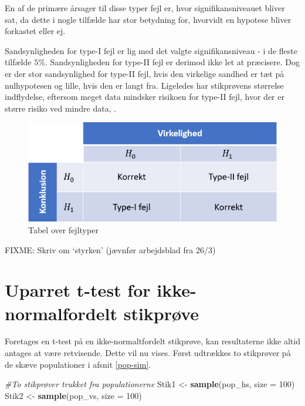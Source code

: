 \documentclass[
]{book}
\newenvironment{Shaded}{\begin{snugshade}}{\end{snugshade}}
\newcommand{\CommentTok}[1]{\textcolor[rgb]{0.56,0.35,0.01}{\textit{#1}}}
\newcommand{\DataTypeTok}[1]{\textcolor[rgb]{0.13,0.29,0.53}{#1}}
\newcommand{\DecValTok}[1]{\textcolor[rgb]{0.00,0.00,0.81}{#1}}
\newcommand{\KeywordTok}[1]{\textcolor[rgb]{0.13,0.29,0.53}{\textbf{#1}}}
\newcommand{\NormalTok}[1]{#1}
\newcommand{\StringTok}[1]{\textcolor[rgb]{0.31,0.60,0.02}{#1}}
\theoremstyle{definition}
\theoremstyle{definition}
\theoremstyle{definition}
\theoremstyle{remark}
\begin{document}
En af de primære årsager til disse typer fejl er, hvor signifikansniveauet bliver sat, da dette i nogle tilfælde har stor betydning for, hvorvidt en hypotese bliver forkastet eller ej.

Sandsynligheden for type-I fejl er lig med det valgte signifikansniveau - i de fleste tilfælde \(5\%\). Sandsynligheden for type-II fejl er derimod ikke let at præcisere. Dog er der stor sandsynlighed for type-II fejl, hvis den virkelige sandhed er tæt på nulhypotesen og lille, hvis den er langt fra. Ligeledes har stikprøvens størrelse indflydelse, eftersom meget data mindsker risikoen for type-II fejl, hvor der er større risiko ved mindre data, \citep{Fejltyper}.

\begin{figure}

{\centering \includegraphics[width=0.75\linewidth]{images/Typefejl}

}

\caption{Tabel over fejltyper}\label{fig:figur-typefejl}
\end{figure}

FIXME: Skriv om `styrken' (jævnfør arbejdsblad fra 26/3)

\hypertarget{uparret-t-test-for-ikke-normalfordelt-stikpruxf8ve}{%
\section{Uparret t-test for ikke-normalfordelt stikprøve}\label{uparret-t-test-for-ikke-normalfordelt-stikpruxf8ve}}

Foretages en t-test på en ikke-normaltfordelt stikprøve, kan resultaterne ikke altid antages at være retvisende. Dette vil nu vises. Først udtrækkes to stikprøver på de skæve populationer i afsnit \ref{pop-sim}.

\begin{Shaded}
\begin{Highlighting}[]
\CommentTok{#To stikprøver trukket fra populationerne}
\NormalTok{Stik1 <-}\StringTok{ }\KeywordTok{sample}\NormalTok{(pop_hs, }\DataTypeTok{size =} \DecValTok{100}\NormalTok{)}
\NormalTok{Stik2 <-}\StringTok{ }\KeywordTok{sample}\NormalTok{(pop_vs, }\DataTypeTok{size =} \DecValTok{100}\NormalTok{)}
\end{Highlighting}
\end{Shaded}
\end{document}
